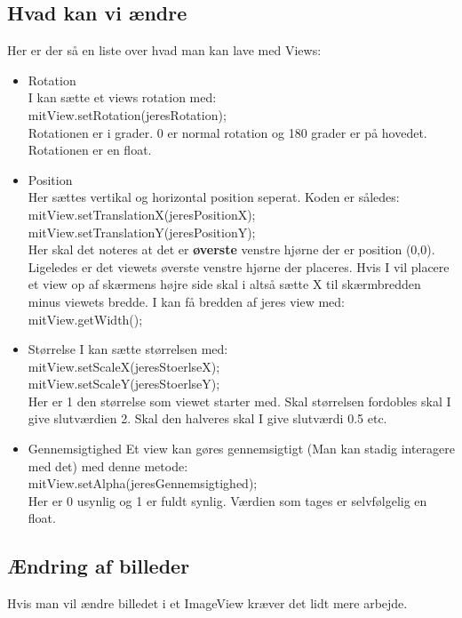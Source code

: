\subsection{Hvad kan vi ændre}
Her er der så en liste over hvad man kan lave med Views:
\begin{itemize}
	\item Rotation \\
		I kan sætte et views rotation med: \\
			mitView.setRotation(jeresRotation);\\
		Rotationen er i grader. 0 er normal rotation og 180 grader er på hovedet. Rotationen er en float.
	\item Position \\
		Her sættes vertikal og horizontal position seperat. Koden er således:\\
			mitView.setTranslationX(jeresPositionX);\\
			mitView.setTranslationY(jeresPositionY);\\
		Her skal det noteres at det er \textbf{øverste} venstre hjørne der er position (0,0). Ligeledes er det viewets øverste venstre hjørne der placeres. Hvis I vil placere et view op af skærmens højre side skal i altså sætte X til skærmbredden minus viewets bredde. I kan få bredden af jeres view med:\\
			mitView.getWidth();\\
	\item Størrelse
		I kan sætte størrelsen med: \\
		mitView.setScaleX(jeresStoerlseX);\\
		mitView.setScaleY(jeresStoerlseY);\\
		Her er 1 den størrelse som viewet starter med. Skal størrelsen fordobles skal I give slutværdien 2. Skal den halveres skal I give slutværdi 0.5 etc.
	\item Gennemsigtighed
		Et view kan gøres gennemsigtigt (Man kan stadig interagere med det) med denne metode:\\
		mitView.setAlpha(jeresGennemsigtighed);\\
		Her er 0 usynlig og 1 er fuldt synlig. Værdien som tages er selvfølgelig en float.
\end{itemize}
\subsection{Ændring af billeder}
Hvis man vil ændre billedet i et ImageView kræver det lidt mere arbejde. 
